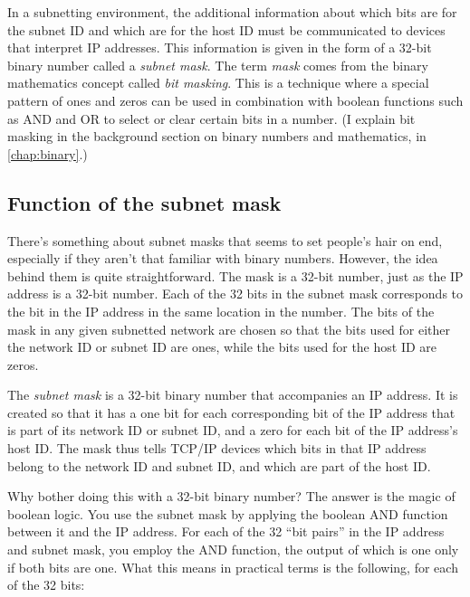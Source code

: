 In a subnetting environment, the additional information about which bits
are for the subnet ID and which are for the host ID must be communicated
to devices that interpret IP addresses. This information is given in the
form of a 32-bit binary number called a {\emph{subnet mask}}. The term
{\emph{mask}} comes from the binary mathematics concept called
{\emph{bit
masking}}. This is a technique where a special pattern of ones and zeros
can be used in combination with boolean functions such as AND and OR to
select or clear certain bits in a number. (I explain bit masking in the
background section on binary numbers and mathematics, in \vref{chap:binary}.)



\subsection{Function of the subnet mask}

There's something about subnet masks that seems to set people's hair on end, especially if they aren't that familiar with binary numbers.
However, the idea behind them is quite straightforward.
The mask is a 32-bit number, just as the IP address is a 32-bit number.
Each of the 32 bits in the subnet mask corresponds to the bit in the IP address in the same location in the number.
The bits of the mask in any given subnetted network are chosen so that the bits used for either the network ID or subnet ID are ones,
while the bits used for the host ID are zeros.


\begin{keyconcept}
The \emph{subnet mask} is a 32-bit binary number that accompanies an IP address.
It is created so that it has a one bit for each corresponding bit of the IP address that is part of its
network ID or subnet ID, and a zero for each bit of the IP address's
host ID. The mask thus tells TCP/IP devices which bits in that IP
address belong to the network ID and subnet ID, and which are part of the host ID.
\end{keyconcept}

Why bother doing this with a 32-bit binary number? The answer is the
magic of boolean logic. You use the subnet mask by applying the boolean
AND function between it and the IP address. For each of the 32 ``bit
pairs'' in the IP address and subnet mask, you employ the AND function,
the output of which is one only if both bits are one. What this means in
practical terms is the following, for each of the 32 bits:

